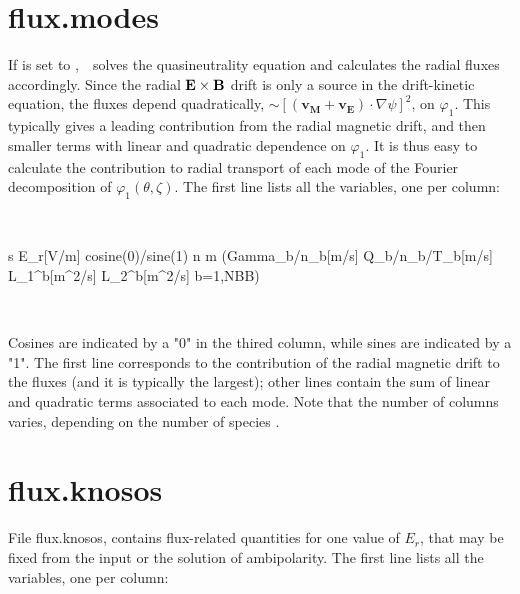
%


\section{\ttfamily flux.modes}

If  is set to \true,~\KNOSOS~solves the quasineutrality equation and calculates the radial fluxes accordingly. Since the radial $\mathbf{E}\times\mathbf{B}$ drift is only a source in the drift-kinetic equation, the fluxes depend quadratically, $\sim \left[(\mathbf{v_M}+\mathbf{v_E})\cdot\nabla\psi\right]^2$, on $\varphi_1$. This typically gives a leading contribution from the radial magnetic drift, and then smaller terms with linear and quadratic dependence on $\varphi_1$. It is thus easy to calculate the contribution to radial transport of each mode of the Fourier decomposition of $\varphi_1(\theta,\zeta)$. The first line lists all the variables, one per column:

\

{\ttfamily s E\_r[V/m] cosine(0)/sine(1)  n  m (\tbl Gamma\_b/n\_b[m/s]  Q\_b/n\_b/T\_b[m/s]  L\_1\^{}b[m\^{}2/s] L\_2\^{}b[m\^{}2/s] b=1,NBB)}


\

Cosines are indicated by a "0" in the thired column, while sines are indicated by a "1". The first line corresponds to the contribution of the radial magnetic drift to the fluxes (and it is typically the largest); other lines contain the sum of linear and quadratic terms associated to each mode. Note that the number of columns varies, depending on the number of species .
          
          

\section{\ttfamily flux.knosos}

File {\ttfamily flux.knosos}, contains flux-related quantities for one value of $E_r$, that may be fixed from the input or the solution of ambipolarity. The first line lists all the variables, one per column:

